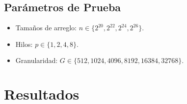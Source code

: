 \documentclass[12pt, a4paper]{article}
\begin{document}
\subsection{Parámetros de Prueba}
\begin{itemize}
    \item Tamaños de arreglo: $n \in \{2^{20}, 2^{22}, 2^{24}, 2^{26}\}$.
    \item Hilos: $p \in \{1, 2, 4, 8\}$.
    \item Granularidad: $G \in \{512, 1024, 4096, 8192, 16384, 32768\}$.
\end{itemize}

\clearpage

\section{Resultados}

\begin{table}[H]
    \centering
    \caption{Rendimiento de los algoritmos paralelos utilizando $p=8$ hilos frente a su ejecución base ($p=1$) para un tamaño de arreglo $N = 2^{26}$.}
    \label{tab:rendimiento_n26}
\end{table}
\end{document}
